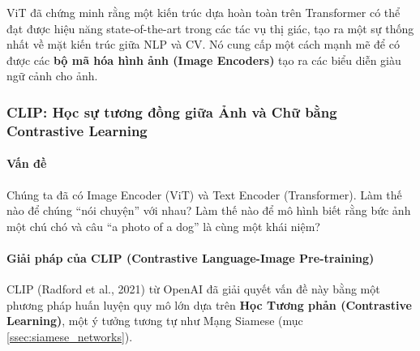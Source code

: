 ViT đã chứng minh rằng một kiến trúc dựa hoàn toàn trên Transformer có thể đạt được hiệu năng state-of-the-art trong các tác vụ thị giác, tạo ra một sự thống nhất về mặt kiến trúc giữa NLP và CV. Nó cung cấp một cách mạnh mẽ để có được các \textbf{bộ mã hóa hình ảnh (Image Encoders)} tạo ra các biểu diễn giàu ngữ cảnh cho ảnh.

\subsubsection{CLIP: Học sự tương đồng giữa Ảnh và Chữ bằng Contrastive Learning}
\paragraph{Vấn đề}
Chúng ta đã có Image Encoder (ViT) và Text Encoder (Transformer). Làm thế nào để chúng “nói chuyện” với nhau? Làm thế nào để mô hình biết rằng bức ảnh một chú chó và câu “a photo of a dog” là cùng một khái niệm?

\paragraph{Giải pháp của CLIP (Contrastive Language-Image Pre-training)}
CLIP (Radford et al., 2021) từ OpenAI đã giải quyết vấn đề này bằng một phương pháp huấn luyện quy mô lớn dựa trên \textbf{Học Tương phản (Contrastive Learning)}, một ý tưởng tương tự như Mạng Siamese (mục \ref{ssec:siamese_networks}).

